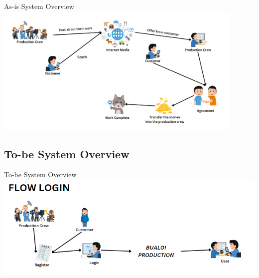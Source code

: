 \documentclass[aspectratio=169]{beamer}
\begin{document}
\begin{frame}{As-is System Overview}
    \centering
    \includegraphics[width=0.9\textwidth]{asis.png}
\end{frame}

\subsection{To-be System Overview}
\begin{frame}{To-be System Overview}
    \centering
    \includegraphics[width=\textwidth]{flowlogin.png}


\end{frame}
\end{document}
